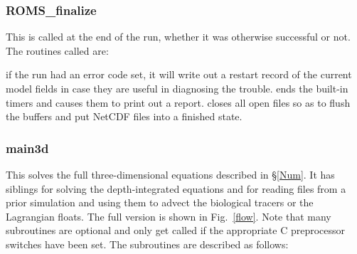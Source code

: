 \subsubsection{ROMS\_finalize}
This is called at the end of the run, whether it was otherwise
successful or not. The routines called are:
\begin{klist}
   if the run had an error code set, it will write out a
  restart record of the current model fields in case they are useful in
  diagnosing the trouble.
   ends the built-in timers and causes them to print
  out a report.
   closes all open files so as to flush the buffers
  and put NetCDF files into a finished state.
\end{klist}

\subsubsection{main3d}
This solves the full three-dimensional equations described in \S\ref{Num}.
It has siblings  for solving the depth-integrated equations
and  for reading files from a prior simulation
and using them to advect the biological tracers or the Lagrangian floats.
The full version is shown in Fig.\ \ref{flow}. Note that many
subroutines are optional and only get called if the appropriate C
preprocessor switches have been set. The subroutines are
described as follows:

